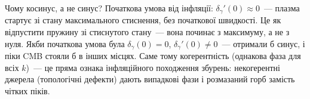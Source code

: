 \begin{keybox}{Чому косинус, а не синус?}
Початкова умова від інфляції: $\delta_\gamma'(0) \approx 0$~---
плазма стартує зі стану максимального стиснення, без
початкової швидкості. Це як відпустити пружину зі стиснутого
стану~--- вона починає з максимуму, а не з нуля.
Якби початкова умова була $\delta_\gamma(0) = 0$, $\delta_\gamma'(0) \neq 0$~---
отримали б синус, і піки CMB стояли б в інших місцях.
Саме тому когерентність (однакова фаза для всіх $k$)~---
це пряма ознака інфляційного походження збурень: некогерентні
джерела (топологічні дефекти) дають випадкові фази і
розмазаний горб замість чітких піків.
\end{keybox}

